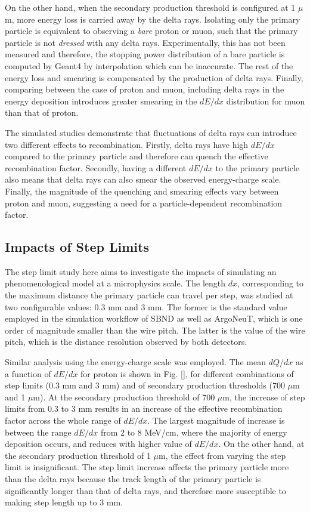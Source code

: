 On the other hand, when the secondary production threshold is configured at 1 $\mu$m, more energy loss is carried away by the delta rays. 
Isolating only the primary particle is equivalent to observing a \textit{bare} proton or muon, such that the primary particle is not \textit{dressed} with any delta rays. 
Experimentally, this has not been measured and therefore, the stopping power distribution of a bare particle is computed by Geant4 by interpolation which can be inaccurate.
The rest of the energy loss and smearing is compensated by the production of delta rays.
Finally, comparing between the case of proton and muon, including delta rays in the energy deposition introduces greater smearing in the $dE/dx$ distribution for muon than that of proton.

The simulated studies demonstrate that fluctuations of delta rays can introduce two different effects to recombination.
Firstly, delta rays have high $dE/dx$ compared to the primary particle and therefore can quench the effective recombination factor.
Secondly, having a different $dE/dx$ to the primary particle also means that delta rays can also smear the observed energy-charge scale.
Finally, the magnitude of the quenching and smearing effects vary between proton and muon, suggesting a need for a particle-dependent recombination factor.   

\subsection{Impacts of Step Limits}
\label{sec:impactStepLimit}

The step limit study here aims to investigate the impacts of simulating an phenomenological model at a microphysics scale.
The length $dx$, corresponding to the maximum distance the primary particle can travel per step, was studied at two configurable values: 0.3 mm and 3 mm. 
The former is the standard value employed in the simulation workflow of SBND as well as ArgoNeuT, which is one order of magnitude smaller than the wire pitch. 
The latter is the value of the wire pitch, which is the distance resolution observed by both detectors.

Similar analysis using the energy-charge scale was employed.
The mean $dQ/dx$ as a function of $dE/dx$ for proton is shown in Fig. \ref{}, for different combinations of step limits (0.3 mm and 3 mm) and of secondary production thresholds (700 $\mu$m and 1 $\mu$m).
At the secondary production threshold of 700 $\mu$m, the increase of step limits from 0.3 to 3 mm results in an increase of the effective recombination factor across the whole range of $dE/dx$.
The largest magnitude of increase is between the range $dE/dx$ from 2 to 8 MeV/cm, where the majority of energy deposition occurs, and reduces with higher value of $dE/dx$.
On the other hand, at the secondary production threshold of 1 $\mu$m, the effect from varying the step limit is insignificant. 
The step limit increase affects the primary particle more than the delta rays because the track length of the primary particle is significantly longer than that of delta rays, and therefore more susceptible to making step length up to 3 mm.

